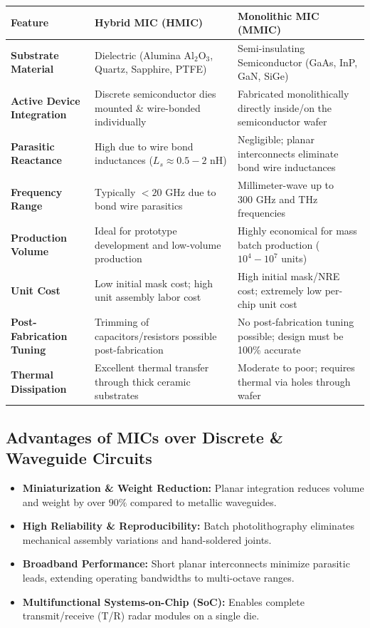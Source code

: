 \documentclass[12pt,a4paper]{article}
\renewcommand{\arraystretch}{1.45}
\begin{document}
\par\vspace{6pt}\noindent
\begingroup
\renewcommand{\arraystretch}{1.4}%
\begin{tabularx}{\linewidth}{|>{\raggedright\arraybackslash\bfseries}p{3.2cm}|Y|Y|}
\hline
\textbf{Feature} & \textbf{Hybrid MIC (HMIC)} & \textbf{Monolithic MIC (MMIC)} \\
\hline
Substrate Material & Dielectric (Alumina $\text{Al}_2\text{O}_3$, Quartz, Sapphire, PTFE) & Semi-insulating Semiconductor (GaAs, InP, GaN, SiGe) \\
\hline
Active Device Integration & Discrete semiconductor dies mounted \& wire-bonded individually & Fabricated monolithically directly inside/on the semiconductor wafer \\
\hline
Parasitic Reactance & High due to wire bond inductances ($L_s \approx 0.5 - 2\text{ nH}$) & Negligible; planar interconnects eliminate bond wire inductances \\
\hline
Frequency Range & Typically $< 20\text{ GHz}$ due to bond wire parasitics & Millimeter-wave up to $300\text{ GHz}$ and THz frequencies \\
\hline
Production Volume & Ideal for prototype development and low-volume production & Highly economical for mass batch production ($10^4 - 10^7$ units) \\
\hline
Unit Cost & Low initial mask cost; high unit assembly labor cost & High initial mask/NRE cost; extremely low per-chip unit cost \\
\hline
Post-Fabrication Tuning & Trimming of capacitors/resistors possible post-fabrication & No post-fabrication tuning possible; design must be 100\% accurate \\
\hline
Thermal Dissipation & Excellent thermal transfer through thick ceramic substrates & Moderate to poor; requires thermal via holes through wafer \\
\hline
\end{tabularx}
\endgroup

\subsection{Advantages of MICs over Discrete \& Waveguide Circuits}
\begin{itemize}[leftmargin=*, itemsep=4pt]
  \item \textbf{Miniaturization \& Weight Reduction:} Planar integration reduces volume and weight by over $90\%$ compared to metallic waveguides.
  \item \textbf{High Reliability \& Reproducibility:} Batch photolithography eliminates mechanical assembly variations and hand-soldered joints.
  \item \textbf{Broadband Performance:} Short planar interconnects minimize parasitic leads, extending operating bandwidths to multi-octave ranges.
  \item \textbf{Multifunctional Systems-on-Chip (SoC):} Enables complete transmit/receive (T/R) radar modules on a single die.
\end{itemize}
\end{document}
